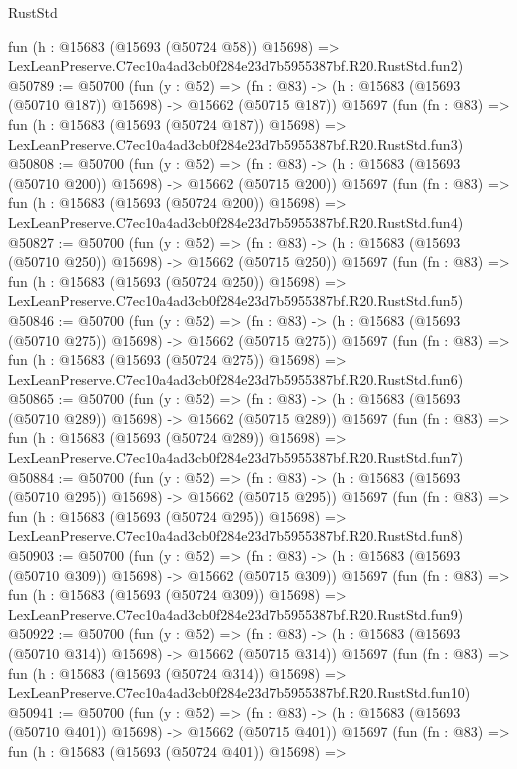 \begin{lexlean}{RustStd}
\begin{coremodule}
    fun (h : @15683 (@15693 (@50724 @58)) @15698) =>
    LexLeanPreserve.C7ec10a4ad3cb0f284e23d7b5955387bf.R20.RustStd.fun2)
@50789 := @50700
    (fun (y : @52) =>
    (fn : @83) -> (h : @15683 (@15693 (@50710 @187)) @15698) -> @15662 (@50715 @187))
    @15697
    (fun (fn : @83) =>
    fun (h : @15683 (@15693 (@50724 @187)) @15698) =>
    LexLeanPreserve.C7ec10a4ad3cb0f284e23d7b5955387bf.R20.RustStd.fun3)
@50808 := @50700
    (fun (y : @52) =>
    (fn : @83) -> (h : @15683 (@15693 (@50710 @200)) @15698) -> @15662 (@50715 @200))
    @15697
    (fun (fn : @83) =>
    fun (h : @15683 (@15693 (@50724 @200)) @15698) =>
    LexLeanPreserve.C7ec10a4ad3cb0f284e23d7b5955387bf.R20.RustStd.fun4)
@50827 := @50700
    (fun (y : @52) =>
    (fn : @83) -> (h : @15683 (@15693 (@50710 @250)) @15698) -> @15662 (@50715 @250))
    @15697
    (fun (fn : @83) =>
    fun (h : @15683 (@15693 (@50724 @250)) @15698) =>
    LexLeanPreserve.C7ec10a4ad3cb0f284e23d7b5955387bf.R20.RustStd.fun5)
@50846 := @50700
    (fun (y : @52) =>
    (fn : @83) -> (h : @15683 (@15693 (@50710 @275)) @15698) -> @15662 (@50715 @275))
    @15697
    (fun (fn : @83) =>
    fun (h : @15683 (@15693 (@50724 @275)) @15698) =>
    LexLeanPreserve.C7ec10a4ad3cb0f284e23d7b5955387bf.R20.RustStd.fun6)
@50865 := @50700
    (fun (y : @52) =>
    (fn : @83) -> (h : @15683 (@15693 (@50710 @289)) @15698) -> @15662 (@50715 @289))
    @15697
    (fun (fn : @83) =>
    fun (h : @15683 (@15693 (@50724 @289)) @15698) =>
    LexLeanPreserve.C7ec10a4ad3cb0f284e23d7b5955387bf.R20.RustStd.fun7)
@50884 := @50700
    (fun (y : @52) =>
    (fn : @83) -> (h : @15683 (@15693 (@50710 @295)) @15698) -> @15662 (@50715 @295))
    @15697
    (fun (fn : @83) =>
    fun (h : @15683 (@15693 (@50724 @295)) @15698) =>
    LexLeanPreserve.C7ec10a4ad3cb0f284e23d7b5955387bf.R20.RustStd.fun8)
@50903 := @50700
    (fun (y : @52) =>
    (fn : @83) -> (h : @15683 (@15693 (@50710 @309)) @15698) -> @15662 (@50715 @309))
    @15697
    (fun (fn : @83) =>
    fun (h : @15683 (@15693 (@50724 @309)) @15698) =>
    LexLeanPreserve.C7ec10a4ad3cb0f284e23d7b5955387bf.R20.RustStd.fun9)
@50922 := @50700
    (fun (y : @52) =>
    (fn : @83) -> (h : @15683 (@15693 (@50710 @314)) @15698) -> @15662 (@50715 @314))
    @15697
    (fun (fn : @83) =>
    fun (h : @15683 (@15693 (@50724 @314)) @15698) =>
    LexLeanPreserve.C7ec10a4ad3cb0f284e23d7b5955387bf.R20.RustStd.fun10)
@50941 := @50700
    (fun (y : @52) =>
    (fn : @83) -> (h : @15683 (@15693 (@50710 @401)) @15698) -> @15662 (@50715 @401))
    @15697
    (fun (fn : @83) =>
    fun (h : @15683 (@15693 (@50724 @401)) @15698) =>

\end{coremodule}
\end{lexlean}
